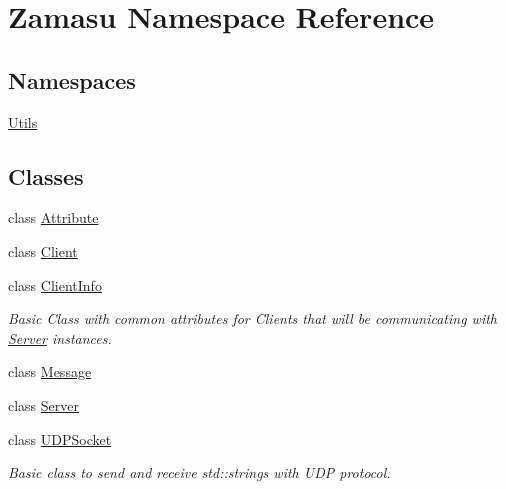\hypertarget{namespace_zamasu}{}\section{Zamasu Namespace Reference}
\label{namespace_zamasu}
\subsection*{Namespaces}
\begin{DoxyCompactItemize}
\item 
 \hyperlink{namespace_zamasu_1_1_utils}{Utils}
\end{DoxyCompactItemize}
\subsection*{Classes}
\begin{DoxyCompactItemize}
\item 
class \hyperlink{class_zamasu_1_1_attribute}{Attribute}
\item 
class \hyperlink{class_zamasu_1_1_client}{Client}
\item 
class \hyperlink{class_zamasu_1_1_client_info}{Client\+Info}
\begin{DoxyCompactList}\small\item\em Basic Class with common attributes for Clients that will be communicating with \hyperlink{class_zamasu_1_1_server}{Server} instances. \end{DoxyCompactList}\item 
class \hyperlink{class_zamasu_1_1_message}{Message}
\item 
class \hyperlink{class_zamasu_1_1_server}{Server}
\item 
class \hyperlink{class_zamasu_1_1_u_d_p_socket}{U\+D\+P\+Socket}
\begin{DoxyCompactList}\small\item\em Basic class to send and receive std\+::string\textquotesingle{}s with U\+DP protocol. \end{DoxyCompactList}\end{DoxyCompactItemize}
